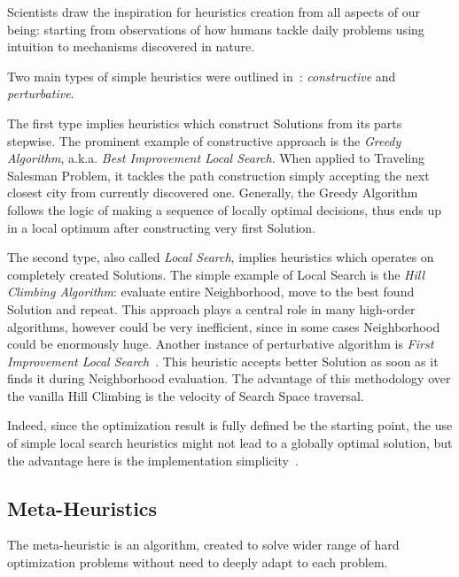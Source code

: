 Scientists draw the inspiration for heuristics creation from all aspects of our being: starting from observations of how humans tackle daily problems using intuition to mechanisms discovered in nature.

Two main types of simple heuristics were outlined in~\cite{burke2019classification}: \textit{constructive} and \textit{perturbative}. 

The first type implies heuristics which construct Solutions from its parts stepwise. 
The prominent example of constructive approach is the \textit{Greedy Algorithm}, a.k.a. \textit{Best Improvement Local Search}. When applied to Traveling Salesman Problem, it tackles the path construction simply accepting the next closest city from currently discovered one. Generally, the Greedy Algorithm follows the logic of making a sequence of locally optimal decisions, thus ends up in a local optimum after constructing very first Solution. 

The second type, also called \textit{Local Search}, implies heuristics which operates on completely created Solutions. The simple example of Local Search is the \textit{Hill Climbing Algorithm}: evaluate entire Neighborhood, move to the best found Solution and repeat. This approach plays a central role in many high-order algorithms, however could be very inefficient, since in some cases Neighborhood could be enormously huge. 
Another instance of perturbative algorithm is \textit{First Improvement Local Search}~\cite{voudouris1999guided}. This heuristic accepts better Solution as soon as it finds it during Neighborhood evaluation. The advantage of this methodology over the vanilla Hill Climbing is the velocity of Search Space traversal.

Indeed, since the optimization result is fully defined be the starting point, the use of simple local search heuristics might not lead to a globally optimal solution, but the advantage here is the implementation simplicity~\cite{williamson2011design}.

 
\subsection{Meta-Heuristics}
The meta-heuristic is an algorithm, created to solve wider range of hard optimization problems without need to deeply adapt to each problem.

